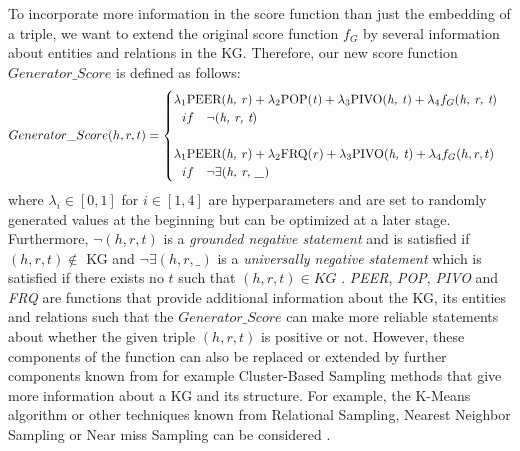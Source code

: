 To incorporate more information in the score function than just the embedding of a triple, we want to extend the original score function $f_G$ by several information about entities and relations in the \ac{KG}.
Therefore, our new score function $Generator\_Score$ is defined as follows:
\begin{equation}
    Generator\_Score(h, r, t)=
    \begin{cases}
         \lambda_1 \text{PEER(\textit{h, r})} + \lambda_2 \text{POP(\textit{t})} + \lambda_3 \text{PIVO(\textit{h, t})} + \lambda_4 f_G(\textit{h, r, t})
         \\ \ \ 
         if\ \ \ \neg(\textit{h, r, t})
         \\ \\
         \lambda_1 \text{PEER(\textit{h, r})} + \lambda_2 \text{FRQ(\textit{r})} + \lambda_3 \text{PIVO(\textit{h, t})} + \lambda_4 f_G(h, r, t)
         \\ \ \ 
         if\ \ \ \neg \exists (\textit{h, r, \_})
         \\
    \end{cases}
\end{equation}
where $\lambda_i \in [0, 1]$ for $i \in [1,4]$ are hyperparameters and are set to randomly generated values at the beginning but can be optimized at a later stage.
Furthermore, $\neg (h, r, t)$ is a \textit{grounded negative statement} and is satisfied if $(h, r, t) \notin$ \ac{KG} and $\neg\exists(h, r, \_)$ is a \textit{universally negative statement} which is satisfied if there exists no $t$ such that $(h, r, t) \in KG$ \cite{arnaout2020enriching}.
\textit{PEER}, \textit{POP}, \textit{PIVO} and \textit{FRQ} are functions that provide additional information about the \ac{KG}, its entities and relations such that the $Generator\_Score$ can make more reliable statements about whether the given triple $(h, r, t)$ is positive or not.
However, these components of the function can also be replaced or extended by further components known from for example Cluster-Based Sampling methods that give more information about a \ac{KG} and its structure.
For example, the K-Means algorithm \cite{qianunderstanding} or other techniques known from Relational Sampling, Nearest Neighbor Sampling or Near miss Sampling can be considered \cite{kotnis2017analysis}.